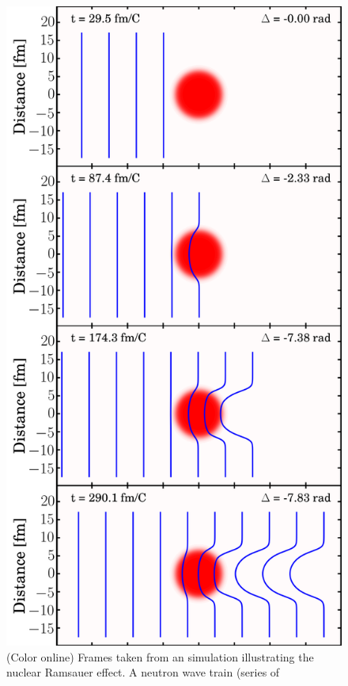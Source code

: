 \begin{figure}
    \hfill\begin{minipage}{0.5\textwidth}\centering
        \includegraphics[scale=0.2]{figures/phaseShiftStillsFigure.png}
        \caption{(Color online) Frames taken from an simulation illustrating the nuclear 
            Ramsauer effect. A neutron wave train (series of
}
\end{minipage}
\end{figure}

